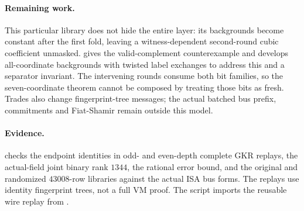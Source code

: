 \paragraph{Remaining work.} This particular library does not hide the entire layer: its backgrounds become constant after the first fold, leaving a witness-dependent second-round cubic coefficient unmasked.  gives the valid-complement counterexample and develops all-coordinate backgrounds with twisted label exchanges to address this and a separator invariant. The intervening rounds consume both bit families, so the seven-coordinate theorem cannot be composed by treating those bits as fresh. Trades also change fingerprint-tree messages; the actual batched bus prefix, commitments and Fiat-Shamir remain outside this model.

\paragraph{Evidence.}  checks the endpoint identities in odd- and even-depth complete GKR replays, the actual-field joint binary rank $1344$, the rational error bound, and the original and randomized $43008$-row libraries against the actual ISA bus forms. The replays use identity fingerprint trees, not a full VM proof. The script imports the reusable wire replay from .
